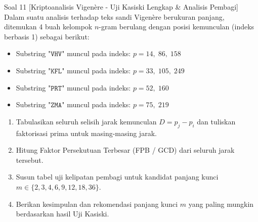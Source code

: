 \documentclass[11pt,a4paper]{article}
\begin{document}

\begin{soalanalisis}{Soal 11 [Kriptoanalisis Vigenère - Uji Kasiski Lengkap \& Analisis Pembagi]}
Dalam suatu analisis terhadap teks sandi Vigenère berukuran panjang, ditemukan 4 buah kelompok $n$-gram berulang dengan posisi kemunculan (indeks berbasis 1) sebagai berikut:
\begin{itemize}[leftmargin=*]
    \item Substring $\texttt{"VHV"}$ muncul pada indeks: $p = 14, \; 86, \; 158$
    \item Substring $\texttt{"KFL"}$ muncul pada indeks: $p = 33, \; 105, \; 249$
    \item Substring $\texttt{"PRT"}$ muncul pada indeks: $p = 52, \; 160$
    \item Substring $\texttt{"ZMA"}$ muncul pada indeks: $p = 75, \; 219$
\end{itemize}
\begin{enumerate}[label=(\alph*)]
    \item Tabulasikan seluruh selisih jarak kemunculan $D = p_j - p_i$ dan tuliskan faktorisasi prima untuk masing-masing jarak.
    \item Hitung Faktor Persekutuan Terbesar (FPB / GCD) dari seluruh jarak tersebut.
    \item Susun tabel uji kelipatan pembagi untuk kandidat panjang kunci $m \in \{2, 3, 4, 6, 9, 12, 18, 36\}$.
    \item Berikan kesimpulan dan rekomendasi panjang kunci $m$ yang paling mungkin berdasarkan hasil Uji Kasiski.
\end{enumerate}
\end{soalanalisis}
\end{document}
